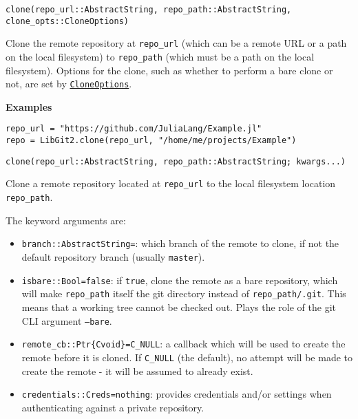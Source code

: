 \begin{adjustwidth}{2em}{0pt}


\begin{verbatim}
clone(repo_url::AbstractString, repo_path::AbstractString, clone_opts::CloneOptions)
\end{verbatim}

Clone the remote repository at \texttt{repo\_url} (which can be a remote URL or a path on the local filesystem) to \texttt{repo\_path} (which must be a path on the local filesystem). Options for the clone, such as whether to perform a bare clone or not, are set by \hyperlink{15963609167797539123}{\texttt{CloneOptions}}.

\textbf{Examples}


\begin{verbatim}
repo_url = "https://github.com/JuliaLang/Example.jl"
repo = LibGit2.clone(repo_url, "/home/me/projects/Example")
\end{verbatim}




\begin{lstlisting}
clone(repo_url::AbstractString, repo_path::AbstractString; kwargs...)
\end{lstlisting}

Clone a remote repository located at \texttt{repo\_url} to the local filesystem location \texttt{repo\_path}.

The keyword arguments are:

\begin{itemize}
\item \texttt{branch::AbstractString={\textquotedbl}{\textquotedbl}}: which branch of the remote to clone, if not the default repository branch (usually \texttt{master}).


\item \texttt{isbare::Bool=false}: if \texttt{true}, clone the remote as a bare repository, which will make \texttt{repo\_path} itself the git directory instead of \texttt{repo\_path/.git}. This means that a working tree cannot be checked out. Plays the role of the git CLI argument \texttt{--bare}.


\item \texttt{remote\_cb::Ptr\{Cvoid\}=C\_NULL}: a callback which will be used to create the remote before it is cloned. If \texttt{C\_NULL} (the default), no attempt will be made to create the remote - it will be assumed to already exist.


\item \texttt{credentials::Creds=nothing}: provides credentials and/or settings when authenticating against a private repository.



\end{itemize}
\end{adjustwidth}
